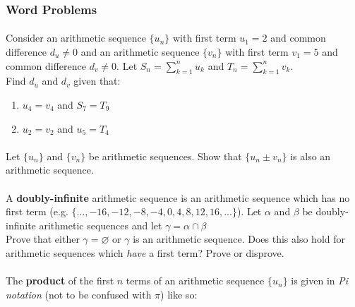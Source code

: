 \documentclass[12pt, a4paper, titlepage, twoside]{article}
\begin{document}
	\subsubsection*{Word Problems}
	
	\paragraph{}
	 Consider an arithmetic sequence $\{u_n\}$ with first term $u_1 = 2$ and common difference 
	$d_u \neq 0$ and an arithmetic sequence $\{v_n\}$ with first term $v_1 = 5$ and common difference $d_v \neq 0$. 
	Let $S_n = \displaystyle \sum_{k=1}^n u_k$ and $T_n = \displaystyle \sum_{k=1}^n v_k$.\\
	
	Find $d_u$ and $d_v$ given that:
	
	\begin{multicols}{2}
		\begin{enumerate}[label=\textbf{(\alph*)}]
			\item $u_4 = v_4$ and $S_7 = T_9$
			\item $u_2 = v_2$ and $u_5 = T_4$
		\end{enumerate}
	\end{multicols}
	
	\paragraph{}
	 Let $\{u_n\}$ and $\{v_n\}$ be arithmetic sequences. Show that $\{u_n \pm v_n\}$ is also an 
	arithmetic sequence.
	
	\paragraph{}
	 A \textbf{doubly-infinite} arithmetic sequence is an arithmetic sequence which has no
	first term (e.g. $\{..., -16, -12, -8, -4, 0, 4, 8, 12, 16, ...\}$). Let $\alpha$ and $\beta$ be doubly-infinite arithmetic
	sequences and let $\gamma = \alpha \cap \beta $\\
	
	Prove that either $\gamma = \varnothing$ or $\gamma$ is an arithmetic sequence. Does this also hold for arithmetic sequences
	which \textit{have} a first term? Prove or disprove.
	
	\paragraph{}
	 The \textbf{product} of the first $n$ terms of an arithmetic sequence $\{u_n\}$ is given in \textit{Pi 
	notation} (not to be confused with $\pi$) like so:
	
\end{document}
